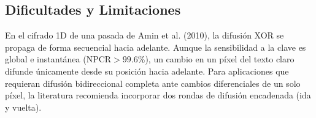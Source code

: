 \documentclass[11pt,letterpaper]{article}
\begin{document}
\subsection{Dificultades y Limitaciones}
En el cifrado 1D de una pasada de Amin et al. (2010), la difusión XOR se propaga de forma secuencial hacia adelante. Aunque la sensibilidad a la clave es global e instantánea ($\text{NPCR} > 99.6\%$), un cambio en un píxel del texto claro difunde únicamente desde su posición hacia adelante. Para aplicaciones que requieran difusión bidireccional completa ante cambios diferenciales de un solo píxel, la literatura recomienda incorporar dos rondas de difusión encadenada (ida y vuelta).

\end{document}
